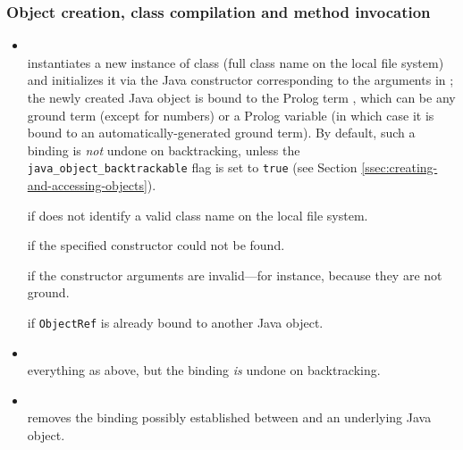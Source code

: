\subsubsection{Object creation, class compilation and method invocation}

\begin{itemize}

\item {}\\
    \noindent{} instantiates a new instance of class  (full class name on the local file system) and initializes it via the Java constructor corresponding to the arguments in ; the newly created Java object is bound to the Prolog term , which can be any ground term (except for numbers) or a Prolog variable (in which case it is bound to an  automatically-generated ground term).
    By default, such a binding is \textit{not} undone on backtracking, unless the \texttt{java\_object\_backtrackable} flag is set to \texttt{true} (see Section \ref{ssec:creating-and-accessing-objects}).


     if  does not identify a valid class name on the local file system.

     if the specified constructor could not be found.

     if the constructor arguments are invalid---for instance, because they are not ground.

     if \texttt{ObjectRef} is already bound to another Java object.


\item {}\\
    everything as above, but the binding \textit{is} undone on backtracking.

\item {}\\
    \noindent{} removes the binding possibly established between  and an underlying Java object.


\end{itemize}
